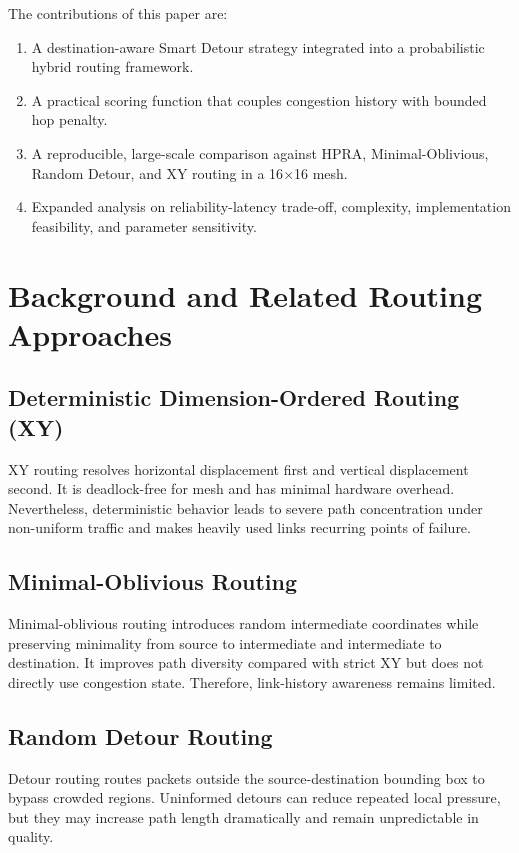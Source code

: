 \documentclass[10pt,a4paper]{article}
\begin{document}
The contributions of this paper are:
\begin{enumerate}[leftmargin=6mm]
    \item A destination-aware Smart Detour strategy integrated into a probabilistic hybrid routing framework.
    \item A practical scoring function that couples congestion history with bounded hop penalty.
    \item A reproducible, large-scale comparison against HPRA, Minimal-Oblivious, Random Detour, and XY routing in a 16$\times$16 mesh.
    \item Expanded analysis on reliability-latency trade-off, complexity, implementation feasibility, and parameter sensitivity.
\end{enumerate}

\section{Background and Related Routing Approaches}
\subsection{Deterministic Dimension-Ordered Routing (XY)}
XY routing resolves horizontal displacement first and vertical displacement second. It is deadlock-free for mesh and has minimal hardware overhead. Nevertheless, deterministic behavior leads to severe path concentration under non-uniform traffic and makes heavily used links recurring points of failure.

\subsection{Minimal-Oblivious Routing}
Minimal-oblivious routing introduces random intermediate coordinates while preserving minimality from source to intermediate and intermediate to destination. It improves path diversity compared with strict XY but does not directly use congestion state. Therefore, link-history awareness remains limited.

\subsection{Random Detour Routing}
Detour routing routes packets outside the source-destination bounding box to bypass crowded regions. Uninformed detours can reduce repeated local pressure, but they may increase path length dramatically and remain unpredictable in quality.
\end{document}
